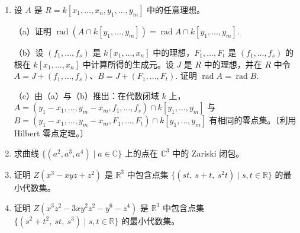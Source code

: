 \begin{enumerate}
（a）证明 \(M = (x)\) 是 \(R\) 中由函数 \(x\) 生成的理想，且 \(M^n = (x^n)\) 由在原点处前 \(n-1\) 阶导数都为零的函数组成。

（b）证明 \(R\) 不是诺特环（与第 7.4 节习题 33 比较）。〔一种途径：设 \(G(x)\) 在 \(x \leq 0\) 时为 0、在 \(x > 0\) 时等于 \(F(x)\)。设 \(I_n\) 是 \(R\) 中对所有 \(x \leq 1/n\) 都为零的函数构成的理想。用 \(G(x)\) 的平移证明 \(I_1 \subsetneq I_2 \subsetneq I_3 \subsetneq \cdots\) 是无限递增链。〕

（c）证明 \(P\) 由在 \(x = 0\) 处各阶导数都为零的所有函数组成（即在 \(x = 0\) 处的 Taylor 级数恒为零的函数），并证明 \(P\) 是素理想。

（d）证明 \(F \in P\)，并由此 \(A \subseteq P\).

（e）证明 \(A \neq P\).〔令 \(G(x) = e^{-1/x^2}\)（\(x \neq 0\)）、\(G(0) = 0\). 证明 \(G \in P\) 但 \(G \notin A\).〕

（f）证明存在包含 \((F)\) 的素理想 \(Q\) 使 \(Q \subsetneq P\)，即存在真包含于 \(P\) 中的非零素理想。

\item 设 \(A\) 是 \(R = k[x_1, \ldots, x_n, y_1, \ldots, y_m]\) 中的任意理想。

（a）证明 \(\operatorname{rad}(A \cap k[y_1, \ldots, y_m]) = \operatorname{rad}A \cap k[y_1, \ldots, y_m]\).

（b）设 \((f_1, \ldots, f_s)\) 是 \(k[x_1, \ldots, x_n]\) 中的理想，\(F_1, \ldots, F_t\) 是 \((f_1, \ldots, f_s)\) 的根在 \(k[x_1, \ldots, x_n]\) 中计算所得的生成元。设 \(J\) 是 \(R\) 中的理想，并在 \(R\) 中令 \(A = J+(f_1, \ldots, f_s)\)、\(B = J+(F_1, \ldots, F_t)\). 证明 \(\operatorname{rad}A = \operatorname{rad}B\).

（c）由（a）与（b）推出：在代数闭域 \(k\) 上，\(A = (y_1-x_1, \ldots, y_m-x_m, f_1, \ldots, f_s) \cap k[y_1, \ldots, y_m]\) 与 \(B = (y_1-x_1, \ldots, y_m-x_m, F_1, \ldots, F_t) \cap k[y_1, \ldots, y_m]\) 有相同的零点集。〔利用 Hilbert 零点定理。〕

\item 求曲线 \(\{(a^2, a^3, a^4) \mid a \in \mathbb{C}\}\) 上的点在 \(\mathbb{C}^3\) 中的 Zariski 闭包。

\item 证明 \(Z(x^3-xyz+z^2)\) 是 \(\mathbb{R}^3\) 中包含点集 \(\{(st,\ s+t,\ s^2t) \mid s, t \in \mathbb{R}\}\) 的最小代数集。

\item 证明 \(Z(x^3z^2-3xy^2z^2-y^6-z^4)\) 是 \(\mathbb{R}^3\) 中包含点集 \(\{(s^2+t^2,\ st,\ s^3) \mid s, t \in \mathbb{R}\}\) 的最小代数集。


\end{enumerate}
